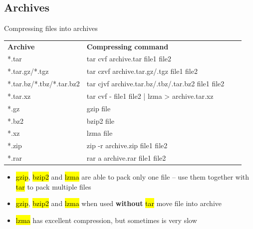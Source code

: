 \documentclass[compress, ucs, xelatex, 11pt, xcolor=svgnames,
  hyperref={
    bookmarks=true,
    unicode=true,
    colorlinks=true,
    pdftitle={Linux, command line and MetaCentrum},
    plainpages=false,
    pdfauthor={Vojtech Zeisek},
    pdfsubject={Course about use of Linux command line, writing shell scripts and using MetaCentrum of CESNET},
    pdfcreator={XeLaTeX},
    pdfkeywords={Linux, GNU, BASH, shell, command line, MetaCentrum},
    linkcolor=Red,
    anchorcolor=Blue,
    citecolor=Purple,
    filecolor=DodgerBlue,
    menucolor=DarkOrchid,
    urlcolor=DeepSkyBlue,
    pdftex},
  url={hyphens, lowtilde} %
  ]{beamer}
\renewcommand{\texttt}[1]{\hl{\ttfamily #1}}
\begin{document}
\subsection{Archives}

\begin{frame}{Compressing files into archives}
\begin{center}
\begin{tabular}{llll}
\textbf{Archive} & \textbf{Compressing command}\\
*.tar & tar cvf archive.tar file1 file2\\
*.tar.gz\alert{/}*.tgz & tar czvf archive.tar.gz\alert{/}.tgz file1 file2\\
*.tar.bz\alert{/}*.tbz\alert{/}*.tar.bz2 & tar cjvf archive.tar.bz\alert{/}.tbz\alert{/}.tar.bz2 file1 file2\\
*.tar.xz & tar cvf - file1 file2 | lzma > archive.tar.xz\\
*.gz & gzip file\\
*.bz2 & bzip2 file\\
*.xz & lzma file\\
*.zip & zip -r archive.zip file1 file2\\
*.rar & rar a archive.rar file1 file2\\
\end{tabular}
\end{center}
\begin{itemize}
  \item \texttt{gzip}, \texttt{bzip2} and \texttt{lzma} are able to pack only one file -- use them together with \texttt{tar} to pack multiple files
  \item \texttt{gzip}, \texttt{bzip2} and \texttt{lzma} when used \textbf{without} \texttt{tar} \alert{move} file into archive
  \item \texttt{lzma} has excellent compression, but sometimes is very slow
\end{itemize}
\end{frame}
\end{document}
